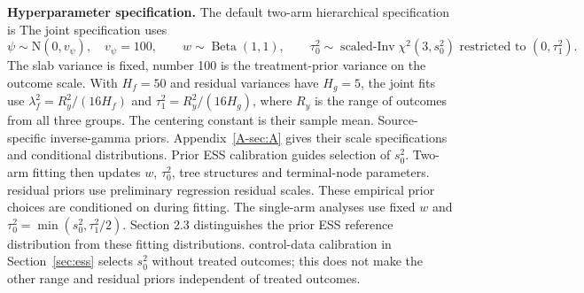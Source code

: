 \documentclass[11pt]{article}
\newcommand{\N}{\mathrm{N}}
\theoremstyle{remark}\newtheorem{remark}{Remark}[section]
\providecommand{\DIFaddtex}[1]{{\protect\color{blue} \sf #1}} %
\providecommand{\DIFdeltex}[1]{{\protect\color{red} \scriptsize #1}} %
\providecommand{\DIFaddbegin}{} %
\providecommand{\DIFaddend}{} %
\providecommand{\DIFdelbegin}{} %
\providecommand{\DIFdelend}{} %
\providecommand{\DIFadd}[1]{\texorpdfstring{\DIFaddtex{#1}}{#1}} %
\providecommand{\DIFdel}[1]{\texorpdfstring{\DIFdeltex{#1}}{}} %
\begin{document}
\DIFdelbegin %
\DIFdel{\textbf{Hyperparameter specification.}
The default two-arm hierarchical specification is
}%
\DIFdelend \DIFaddbegin \DIFadd{The joint specification uses
}\begin{equation}\label{eq:hyper}
\psi\sim\N(0,v_\psi),\quad v_\psi=100,\qquad
w\sim\operatorname{Beta}(1,1),\qquad
\tau_0^2\sim\operatorname{scaled\text{-}Inv}\chi^2(3,s_0^2)
\text{ restricted to }(0,\tau_1^2).
\end{equation}\DIFaddend 
The \DIFdelbegin \DIFdel{slab variance is fixed, }\DIFdelend \DIFaddbegin \DIFadd{number 100 is the treatment-prior variance on the outcome scale. With $H_f=50$ }\DIFaddend and \DIFdelbegin \DIFdel{residual variances have }\DIFdelend \DIFaddbegin \DIFadd{$H_g=5$, the joint fits use $\lambda_f^2=R_y^2/(16H_f)$ and $\tau_1^2=R_y^2/(16H_g)$, where $R_y$ is the range of outcomes from all three groups. The centering constant is their sample mean. Source-specific }\DIFaddend inverse-gamma \DIFdelbegin \DIFdel{priors. Appendix~\ref{A-sec:A} gives their scale specifications and conditional distributions. Prior ESS calibration guides selection of $s_0^2$. Two-arm fitting then updates $w$, $\tau_0^2$, tree structures and terminal-node parameters. }\DIFdelend \DIFaddbegin \DIFadd{residual priors use preliminary regression residual scales. These empirical prior choices are conditioned on during fitting. }\DIFaddend The \DIFdelbegin \DIFdel{single-arm analyses use fixed $w$ and $\tau_0^2=\min(s_0^2,\tau_1^2/2)$.
Section 2.3 distinguishes the prior ESS reference distribution from these fitting distributions. }\DIFdelend \DIFaddbegin \DIFadd{control-data calibration in Section~\ref{sec:ess} selects $s_0^2$ without treated outcomes; this does not make the other range and residual priors independent of treated outcomes.
}\DIFaddend 
\end{document}
